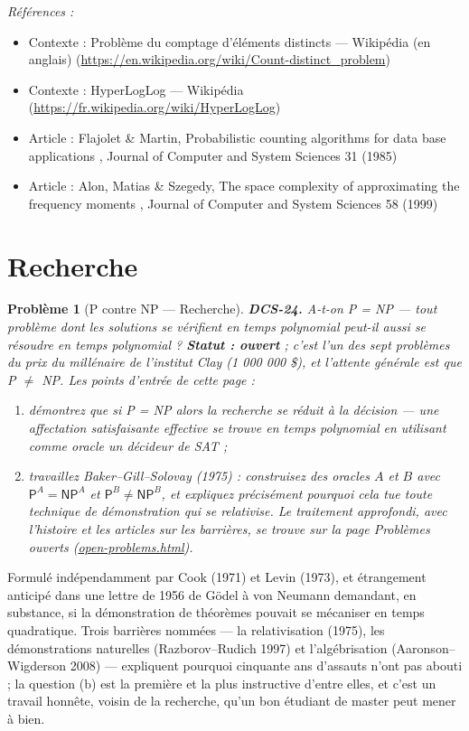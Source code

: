 \documentclass[11pt]{article}
\newtheorem{problem}{Problème}
\newenvironment{refs}{\par\small\noindent\emph{Références :}\begin{itemize}\setlength\itemsep{0pt}}{\end{itemize}\normalsize}
\begin{document}
\begin{refs}
\item Contexte : Problème du comptage d'éléments distincts --- Wikipédia (en anglais) (\url{https://en.wikipedia.org/wiki/Count-distinct_problem})
\item Contexte : HyperLogLog --- Wikipédia (\url{https://fr.wikipedia.org/wiki/HyperLogLog})
\item Article : Flajolet \& Martin, \og{} Probabilistic counting algorithms for data base applications \fg{}, Journal of Computer and System Sciences 31 (1985)
\item Article : Alon, Matias \& Szegedy, \og{} The space complexity of approximating the frequency moments \fg{}, Journal of Computer and System Sciences 58 (1999)
\end{refs}

\bigskip


\section*{Recherche}

\begin{problem}[{P contre NP --- Recherche}]
\textbf{DCS-24.} A-t-on P = NP --- tout problème dont les solutions se vérifient en temps polynomial peut-il aussi se résoudre en temps polynomial ? \textbf{Statut : ouvert} ; c'est l'un des sept problèmes du prix du millénaire de l'institut Clay (1 000 000 \$), et l'attente générale est que P $\ne$ NP. Les points d'entrée de cette page :
\begin{enumerate}
\item[(a)] démontrez que si P = NP alors la recherche se réduit à la décision --- une affectation satisfaisante effective se trouve en temps polynomial en utilisant comme oracle un décideur de SAT ;
\item[(b)] travaillez Baker--Gill--Solovay (1975) : construisez des oracles $A$ et $B$ avec $\mathsf{P}^A = \mathsf{NP}^A$ et $\mathsf{P}^B \ne \mathsf{NP}^B$, et expliquez précisément pourquoi cela tue toute technique de démonstration qui se relativise. Le traitement approfondi, avec l'histoire et les articles sur les barrières, se trouve sur la page Problèmes ouverts (\url{open-problems.html}).
\end{enumerate}

\end{problem}

\noindent Formulé indépendamment par Cook (1971) et Levin (1973), et étrangement anticipé dans une lettre de 1956 de Gödel à von Neumann demandant, en substance, si la démonstration de théorèmes pouvait se mécaniser en temps quadratique. Trois barrières nommées --- la relativisation (1975), les démonstrations naturelles (Razborov--Rudich 1997) et l'algébrisation (Aaronson--Wigderson 2008) --- expliquent pourquoi cinquante ans d'assauts n'ont pas abouti ; la question (b) est la première et la plus instructive d'entre elles, et c'est un travail honnête, voisin de la recherche, qu'un bon étudiant de master peut mener à bien.
\end{document}
